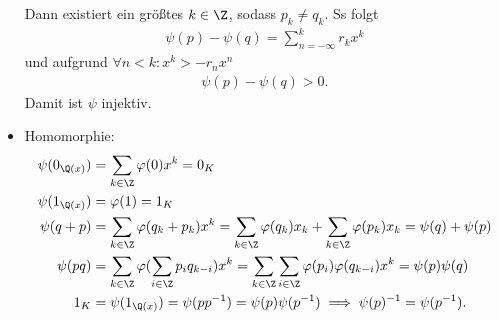\begin{solution}
\begin{itemize}
  Dann existiert ein größtes $k \in \Z$, sodass $p_k \neq q_k$. Ss folgt
  \begin{align*}
    \psi(p) - \psi(q) = \sum_{n = -\infty}^kr_kx^k
  \end{align*}
  und aufgrund $\forall n < k: x^k > -r_nx^n$
  \begin{align*}
    \psi(p) - \psi(q) > 0.
  \end{align*}
  Damit ist $\psi$ injektiv.
  \item Homomorphie:
  \begin{align*}
    \psi(0_{\Q(x)}) &= \sum_{k \in \Z}\varphi(0)x^k = 0_K \\
    \psi(1_{\Q(x)}) &= \varphi(1) = 1_K \\
    \psi(q + p) &= \sum_{k \in \Z}\varphi(q_k + p_k)x^k =
    \sum_{k \in \Z}\varphi(q_k)x_k + \sum_{k \in \Z}\varphi(p_k)x_k
    = \psi(q) + \psi(p) \\
    \psi(pq) &= \sum_{k \in \Z}\varphi(\sum_{i \in \Z}p_iq_{k-i})x^k =
    \sum_{k \in \Z}\sum_{i \in \Z}\varphi(p_i)\varphi(q_{k-i})x^k
    = \psi(p)\psi(q) \\
    1_K &= \psi(1_{\Q(x)}) = \psi(pp^{-1}) = \psi(p)\psi(p^{-1})
    \implies \psi(p)^{-1} = \psi(p^{-1}).
  \end{align*}
\end{itemize}
\end{solution}
